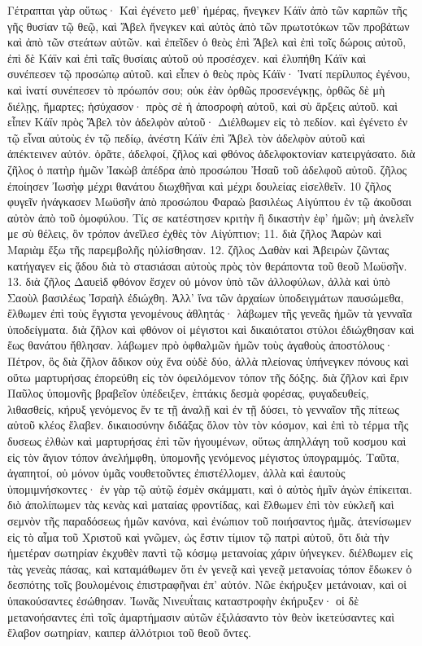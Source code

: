 Γέτραπται γὰρ οὕτως· Καὶ ἐγένετο μεθ’ ἡμέρας, ἤνεγκεν Κάϊν ἀπὸ τῶν καρπῶν τῆς γῆς θυσίαν τῷ θεῷ, καὶ Ἄβελ ἤνεγκεν καὶ αὐτὸς ἀπὸ τῶν πρωτοτόκων τῶν προβάτων καὶ ἀπὸ τῶν στεάτων αὐτῶν. καὶ ἐπεῖδεν ὁ θεὸς ἐπὶ Ἄβελ καὶ ἐπὶ τοῖς δώροις αὐτοῦ, ἐπὶ δὲ Κάϊν καὶ ἐπὶ ταῖς θυσίαις αὐτοῦ οὐ προσέσχεν. καὶ ἐλυπήθη Κάϊν καὶ συνέπεσεν τῷ προσώπῳ αὐτοῦ. καὶ εἶπεν ὁ θεὸς πρὸς Κάϊν· Ἱνατί περίλυπος ἐγένου, καὶ ἱνατί συνέπεσεν τὸ πρόωπόν σου; οὐκ ἐὰν ὀρθῶς προσενέγκῃς, ὀρθῶς δὲ μὴ διέλῃς, ἥμαρτες; ἡσύχασον· πρὸς σὲ ἡ ἀποσροφὴ αὐτοῦ, καὶ σὺ ἄρξεις αὐτοῦ. καὶ εἶπεν Κάϊν πρὸς Ἄβελ τὸν ἀδελφὸν αὐτοῦ· Διέλθωμεν εἰς τὸ πεδίον. καὶ ἐγένετο ἐν τῷ εἶναι αὐτοὺς ἐν τῷ πεδίῳ, ἀνέστη Κάϊν ἐπὶ Ἄβελ τὸν ἀδελφὸν αὐτοῦ καὶ ἀπέκτεινεν αὐτόν. ὁρᾶτε, ἀδελφοί, ζῆλος καὶ φθόνος ἀδελφοκτονίαν κατειργάσατο. διὰ ζῆλος ὁ πατὴρ ἡμῶν Ἰακὼβ ἀπέδρα ἀπὸ προσώπου Ἠσαῦ τοῦ ἀδελφοῦ αὐτοῦ. ζῆλος ἐποίησεν Ἰωσὴφ μέχρι θανάτου διωχθῆναι καὶ μέχρι δουλείας εἰσελθεῖν. 10 ζῆλος φυγεῖν ἠνάγκασεν Μωϋσῆν ἀπὸ προσώπου Φαραὼ βασιλέως Αἰγύπτου ἐν τῷ ἀκοῦσαι αὐτὸν ἀπὸ τοῦ ὁμοφύλου. Τίς σε κατέστησεν κριτὴν ἢ δικαστὴν ἐφ’ ἡμῶν; μὴ ἀνελεῖν με σὺ θέλεις, ὃν τρόπον ἀνεῖλεσ ἐχθὲς τὸν Αἰγύπτιον; 11. διὰ ζῆλος Ἀαρὼν καὶ Μαριὰμ ἔξω τῆς παρεμβολῆς ηὐλίσθησαν. 12. ζῆλος Δαθὰν καὶ Ἀβειρὼν ζῶντας κατήγαγεν εἰς ᾅδου διὰ τὸ στασιάσαι αὐτοὺς πρὸς τὸν θεράποντα τοῦ θεοῦ Μωϋσῆν. 13. διὰ ζῆλος Δαυεὶδ φθόνον ἔσχεν οὐ μόνον ὑπὸ τῶν ἀλλοφύλων, ἀλλὰ καὶ ὑπὸ Σαοὺλ βασιλέως Ἰσραὴλ ἐδιώχθη.
Ἀλλ’ ἵνα τῶν ἀρχαίων ὑποδειγμάτων παυσώμεθα, ἔλθωμεν ἐπὶ τοὺς ἔγγιστα γενομένους ἀθλητάς· λάβωμεν τῆς γενεᾶς ἡμῶν τὰ γενναῖα ὑποδείγματα. διὰ ζῆλον καὶ φθόνον οἱ μέγιστοι καὶ δικαιότατοι στύλοι ἐδιώχθησαν καὶ ἕως θανάτου ἤθλησαν. λάβωμεν πρὸ ὀφθαλμῶν ἡμῶν τοὺς ἀγαθοὺς ἀποστόλους· Πέτρον, ὃς διὰ ζῆλον ἄδικον οὐχ ἕνα οὐδὲ δύο, ἀλλὰ πλείονας ὑπήνεγκεν πόνους καὶ οὕτω μαρτυρήσας ἐπορεύθη εἰς τὸν ὀφειλόμενον τόπον τῆς δόξης. διὰ ζῆλον καὶ ἔριν Παῦλος ὑπομονῆς βραβεῖον ὑπέδειξεν, ἑπτάκις δεσμὰ φορέσας, φυγαδευθείς, λιθασθείς, κήρυξ γενόμενος ἔν τε τῇ ἀναλῇ καὶ ἐν τῇ δύσει, τὸ γενναῖον τῆς πίτεως αὐτοῦ κλέος ἔλαβεν. δικαιοσύνην διδάξας ὅλον τὸν τὸν κόσμον, καὶ ἐπὶ τὸ τέρμα τῆς δυσεως ἐλθὼν καὶ μαρτυρήσας ἐπὶ τῶν ἡγουμένων, οὕτως ἀπηλλάγη τοῦ κοσμου καὶ εἰς τὸν ἅγιον τόπον ἀνελήμφθη, ὑπομονῆς γενόμενος μέγιστος ὑπογραμμός.
Ταῦτα, ἀγαπητοί, οὐ μόνον ὑμᾶς νουθετοῦντες ἐπιστέλλομεν, ἀλλὰ καὶ ἑαυτοὺς ὑπομιμνήσκοντες· ἐν γὰρ τῷ αὐτῷ ἐσμὲν σκάμματι, καὶ ὁ αὐτὸς ἡμῖν ἀγὼν ἐπίκειται. διὸ ἀπολίπωμεν τὰς κενὰς καὶ ματαίας φροντίδας, καὶ ἔλθωμεν ἐπὶ τὸν εὐκλεῆ καὶ σεμνὸν τῆς παραδόσεως ἡμῶν κανόνα, καὶ ἐνώπιον τοῦ ποιήσαντος ἡμᾶς. ἀτενίσωμεν εἰς τὸ αἷμα τοῦ Χριστοῦ καὶ γνῶμεν, ὡς ἔστιν τίμιον τῷ πατρὶ αὐτοῦ, ὅτι διὰ τὴν ἡμετέραν σωτηρίαν ἐκχυθὲν παντὶ τῷ κόσμῳ μετανοίας χάριν ὑήνεγκεν. διέλθωμεν εἰς τὰς γενεὰς πάσας, καὶ καταμάθωμεν ὅτι ἐν γενεᾷ καὶ γενεᾷ μετανοίας τόπον ἔδωκεν ὁ δεσπότης τοῖς βουλομένοις ἐπιστραφῆναι ἐπ’ αὐτόν. Νῶε ἐκήρυξεν μετάνοιαν, καὶ οἱ ὑπακούσαντες ἐσώθησαν. Ἰωνᾶς Νινευΐταις καταστροφὴν ἐκήρυξεν· οἱ δὲ μετανοήσαντες ἐπὶ τοῖς ἁμαρτήμασιν αὐτῶν ἐξιλάσαντο τὸν θεὸν ἱκετεύσαντες καὶ ἔλαβον σωτηρίαν, καιπερ ἀλλότριοι τοῦ θεοῦ ὄντες.
